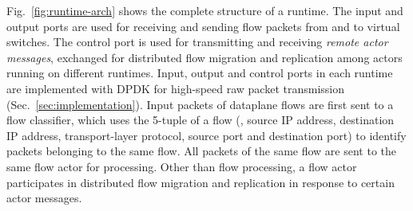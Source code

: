 Fig.~\ref{fig:runtime-arch} shows the complete structure of a runtime. The input and output ports are used for receiving and sending flow packets from and to virtual switches. The control port %
is used for transmitting and receiving {\em remote actor messages}, exchanged for distributed flow migration and replication among actors running on different runtimes.  %
 Input, output and control ports in each runtime are implemented with DPDK for high-speed raw packet transmission (Sec.~\ref{sec:implementation}).
 Input packets of dataplane flows are first sent to a flow classifier, which uses the 5-tuple of a flow (\ie, source IP address, destination IP address, transport-layer protocol, source port and destination port) to identify packets belonging to the same flow. %
 All packets of the same flow are sent to the same flow actor for processing. Other than flow processing, a flow actor participates in distributed flow migration and replication in response to certain actor messages. %




